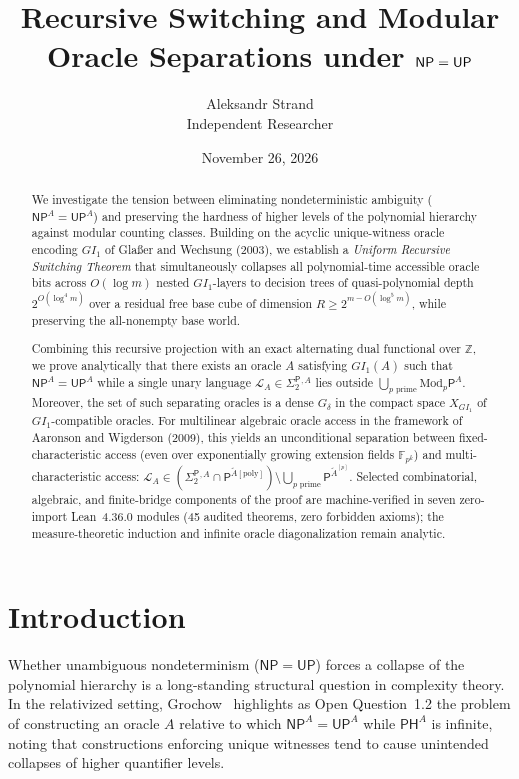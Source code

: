 \documentclass[11pt,a4paper]{article}
\title{\textbf{Recursive Switching and Modular Oracle Separations under $\NP = \UP$}}
\author{Aleksandr Strand\\ \small Independent Researcher}
\date{November 26, 2026}
\theoremstyle{definition}
\theoremstyle{remark}
\newcommand{\Pcl}{\mathsf{P}}
\newcommand{\NP}{\mathsf{NP}}
\newcommand{\UP}{\mathsf{UP}}
\newcommand{\PH}{\mathsf{PH}}
\newcommand{\Modp}{\mathrm{Mod}_p\mathsf{P}}
\newcommand{\SigTwo}{\Sigma_2^{\mathsf{P}}}
\newcommand{\F}{\mathbb{F}}
\newcommand{\Z}{\mathbb{Z}}
\newcommand{\GI}{GI_1}
\begin{document}
\maketitle

\begin{abstract}
We investigate the tension between eliminating nondeterministic ambiguity ($\NP^A = \UP^A$) and preserving the hardness of higher levels of the polynomial hierarchy against modular counting classes. Building on the acyclic unique-witness oracle encoding $\GI$ of Gla\ss er and Wechsung (2003), we establish a \emph{Uniform Recursive Switching Theorem} that simultaneously collapses all polynomial-time accessible oracle bits across $O(\log m)$ nested $\GI$-layers to decision trees of quasi-polynomial depth $2^{O(\log^4 m)}$ over a residual free base cube of dimension $R \ge 2^{m - O(\log^5 m)}$, while preserving the all-nonempty base world.

Combining this recursive projection with an exact alternating dual functional over $\Z$, we prove analytically that there exists an oracle $A$ satisfying $\GI(A)$ such that $\NP^A = \UP^A$ while a single unary language $\mathcal{L}_A \in \SigTwo{}^{,A}$ lies outside $\bigcup_{p\text{ prime}} \Modp^A$. Moreover, the set of such separating oracles is a dense $G_\delta$ in the compact space $X_{\GI}$ of $\GI$-compatible oracles. For multilinear algebraic oracle access in the framework of Aaronson and Wigderson (2009), this yields an unconditional separation between fixed-characteristic access (even over exponentially growing extension fields $\F_{p^k}$) and multi-characteristic access: $\mathcal{L}_A \in (\SigTwo{}^{,A} \cap \Pcl^{\widetilde{A}[\mathrm{poly}]}) \setminus \bigcup_{p\text{ prime}} \Pcl^{\widetilde{A}^{[p]}}$. Selected combinatorial, algebraic, and finite-bridge components of the proof are machine-verified in seven zero-import Lean~4.36.0 modules (45 audited theorems, zero forbidden axioms); the measure-theoretic induction and infinite oracle diagonalization remain analytic.
\end{abstract}

\section{Introduction}

Whether unambiguous nondeterminism ($\NP = \UP$) forces a collapse of the polynomial hierarchy is a long-standing structural question in complexity theory. In the relativized setting, Grochow~\cite{Grochow2023} highlights as Open Question~1.2 the problem of constructing an oracle $A$ relative to which $\NP^A = \UP^A$ while $\PH^A$ is infinite, noting that constructions enforcing unique witnesses tend to cause unintended collapses of higher quantifier levels.
\end{document}
